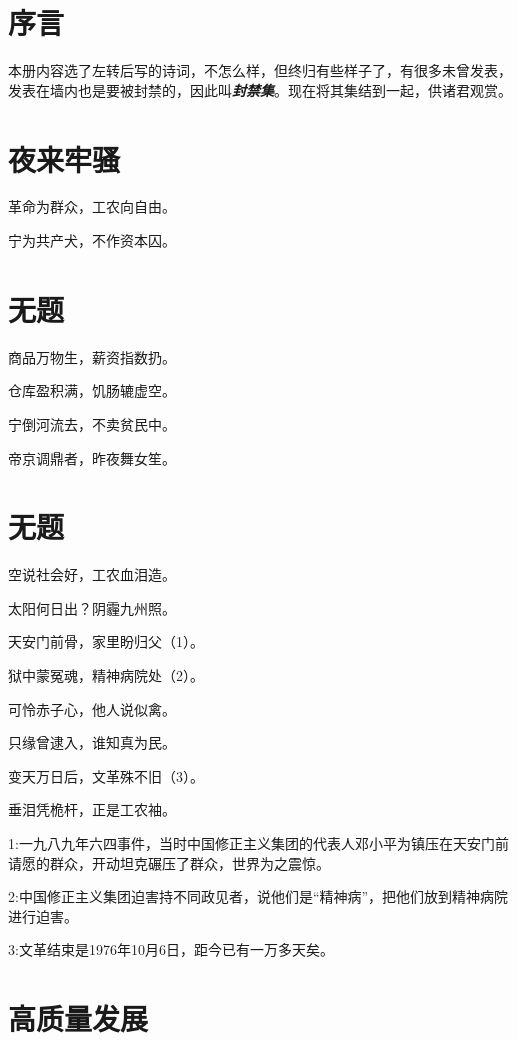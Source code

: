 \documentclass[
]{article}
\author{}
\date{}
\begin{document}
\tableofcontents
\newpage

\section{序言}\label{ux5e8fux8a00}

本册内容选了左转后写的诗词，不怎么样，但终归有些样子了，有很多未曾发表，发表在墙内也是要被封禁的，因此叫\textbf{\emph{封禁集}}。现在将其集结到一起，供诸君观赏。

\section{夜来牢骚}\label{ux591cux6765ux7262ux9a9a}

革命为群众，工农向自由。

宁为共产犬，不作资本囚。

\section{无题}\label{ux65e0ux9898}

商品万物生，薪资指数扔。

仓库盈积满，饥肠辘虚空。

宁倒河流去，不卖贫民中。

帝京调鼎者，昨夜舞女笙。

\section{无题}\label{ux65e0ux9898-1}

空说社会好，工农血泪造。

太阳何日出？阴霾九州照。

天安门前骨，家里盼归父（1）。

狱中蒙冤魂，精神病院处（2）。

可怜赤子心，他人说似禽。

只缘曾逮入，谁知真为民。

变天万日后，文革殊不旧（3）。

垂泪凭桅杆，正是工农袖。

1:一九八九年六四事件，当时中国修正主义集团的代表人邓小平为镇压在天安门前请愿的群众，开动坦克碾压了群众，世界为之震惊。

2:中国修正主义集团迫害持不同政见者，说他们是``精神病''，把他们放到精神病院进行迫害。

3:文革结束是1976年10月6日，距今已有一万多天矣。

\section{高质量发展}\label{ux9ad8ux8d28ux91cfux53d1ux5c55}
\end{document}
